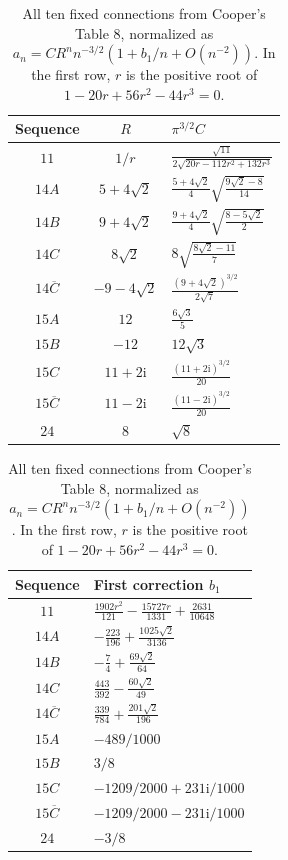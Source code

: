 \documentclass[11pt,letterpaper]{article}
\numberwithin{equation}{section}
\theoremstyle{definition}\newtheorem{definition}[theorem]{Definition}
\theoremstyle{remark}\newtheorem{remark}[theorem]{Remark}
\newcommand{\ii}{\mathrm i}
\begin{document}
\begin{table}[p]
\centering
\caption{All ten fixed connections from Cooper's Table 8, normalized as $a_n=CR^n n^{-3/2}(1+b_1/n+O(n^{-2}))$. In the first row, $r$ is the positive root of $1-20r+56r^2-44r^3=0$.}
\label{cmz:tab:constants}
\renewcommand{\arraystretch}{1.9}
\begin{tabular}{ccl}
\toprule
Sequence & $R$ & $\pi^{3/2}C$\\
\midrule
$11$ & $1/r$ & $\displaystyle\frac{\sqrt{11}}{2\sqrt{20r-112r^2+132r^3}}$\\
$14A$ & $5+4\sqrt2$ & $\displaystyle\frac{5+4\sqrt2}{4}\sqrt{\frac{9\sqrt2-8}{14}}$\\
$14B$ & $9+4\sqrt2$ & $\displaystyle\frac{9+4\sqrt2}{4}\sqrt{\frac{8-5\sqrt2}{2}}$\\
$14C$ & $8\sqrt2$ & $\displaystyle 8\sqrt{\frac{8\sqrt2-11}{7}}$\\
$14\overline C$ & $-9-4\sqrt2$ & $\displaystyle\frac{(9+4\sqrt2)^{3/2}}{2\sqrt7}$\\
$15A$ & $12$ & $\displaystyle\frac{6\sqrt3}{5}$\\
$15B$ & $-12$ & $12\sqrt3$\\
$15C$ & $11+2\ii$ & $\displaystyle\frac{(11+2\ii)^{3/2}}{20}$\\
$15\overline C$ & $11-2\ii$ & $\displaystyle\frac{(11-2\ii)^{3/2}}{20}$\\
$24$ & $8$ & $\sqrt8$\\
\bottomrule
\end{tabular}
\vspace{1.5em}

\renewcommand{\arraystretch}{1.6}
\begin{tabular}{cl}
\toprule
Sequence & First correction $b_1$\\
\midrule
$11$ & $\displaystyle\frac{1902r^2}{121}-\frac{15727r}{1331}+\frac{2631}{10648}$\\\addlinespace[2pt]
$14A$ & $\displaystyle-\frac{223}{196}+\frac{1025\sqrt2}{3136}$\\\addlinespace[2pt]
$14B$ & $\displaystyle-\frac74+\frac{69\sqrt2}{64}$\\\addlinespace[2pt]
$14C$ & $\displaystyle\frac{443}{392}-\frac{60\sqrt2}{49}$\\\addlinespace[2pt]
$14\overline C$ & $\displaystyle\frac{339}{784}+\frac{201\sqrt2}{196}$\\\addlinespace[2pt]
$15A$ & $-489/1000$\\
$15B$ & $3/8$\\
$15C$ & $-1209/2000+231\ii/1000$\\
$15\overline C$ & $-1209/2000-231\ii/1000$\\
$24$ & $-3/8$\\
\bottomrule
\end{tabular}
\end{table}
\clearpage
\end{document}
